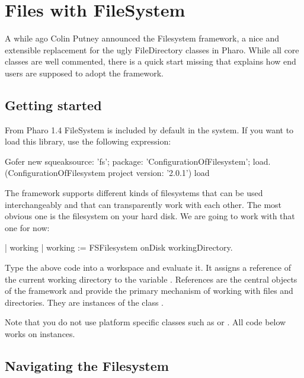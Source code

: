 \documentclass[a4paper,10pt,twoside]{book}
\begin{document}
\fi
\sloppy
\chapter{Files with FileSystem }
\chapterauthor{\authorsteph{}}

A while ago Colin Putney announced the Filesystem framework, a nice and extensible replacement for the ugly FileDirectory classes in Pharo. While all core classes are well commented, there is a quick start missing that explains how end users are supposed to adopt the framework. 

\section{Getting started}
From Pharo 1.4 FileSystem is included by default in the system. If you want to load this library, use the following expression:

\begin{code}{}
Gofer new
  squeaksource: 'fs'; 
  package: 'ConfigurationOfFilesystem';
  load.
(ConfigurationOfFilesystem project version:  '2.0.1') load
\end{code}     

The framework supports different kinds of filesystems that can be used interchangeably and that can transparently work with each other. The most obvious one is the filesystem on your hard disk. We are going to work with that one for now:

\begin{code}{}
| working |
working := FSFilesystem onDisk workingDirectory.
\end{code} 

Type the above code into a workspace and evaluate it. It assigns a reference of the current working directory to the variable . References are the central objects of the framework and provide the primary mechanism of working with files and directories. They are instances of the class .

Note that you do not use platform specific classes such as  or . All code below works on  instances.


\section{Navigating the Filesystem}
\end{document}
